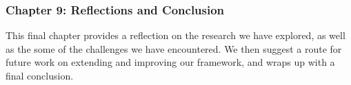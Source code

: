 \subsubsection{Chapter 9: Reflections and Conclusion}

This final chapter provides a reflection on the research we have explored, as well as the some of the challenges we have encountered. We then suggest a route for future work on extending and improving our framework, and wraps up with a final conclusion.

%
%
%
%
%
%
%
%
%
%
%
%
%
%
%
%
